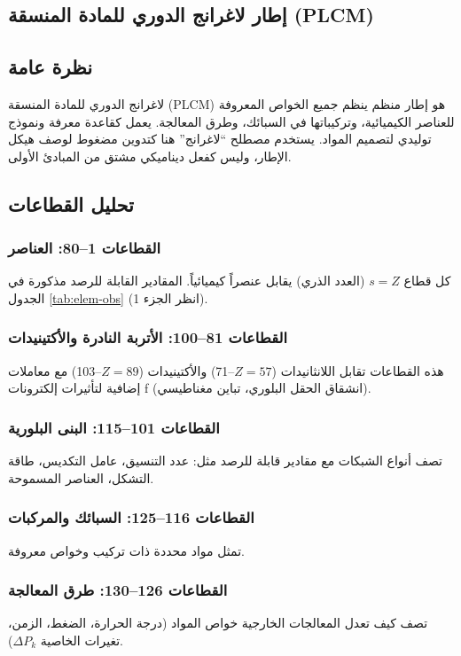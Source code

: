 \documentclass[11pt,a4paper]{article}
\begin{document}
\begin{otherlanguage}{arabic}
		\section{إطار لاغرانج الدوري للمادة المنسقة (PLCM)}
		
		\subsection{نظرة عامة}
		
		لاغرانج الدوري للمادة المنسقة (PLCM) هو إطار منظم ينظم جميع الخواص المعروفة للعناصر الكيميائية، وتركيباتها في السبائك، وطرق المعالجة. يعمل كقاعدة معرفة ونموذج توليدي لتصميم المواد. يستخدم مصطلح “لاغرانج” هنا كتدوين مضغوط لوصف هيكل الإطار، وليس كفعل ديناميكي مشتق من المبادئ الأولى.
		
		\subsection{تحليل القطاعات}
		
		\subsubsection{القطاعات 1–80: العناصر}
		كل قطاع \(s = Z\) (العدد الذري) يقابل عنصراً كيميائياً. المقادير القابلة للرصد مذكورة في الجدول \ref{tab:elem-obs} (انظر الجزء 1).
		
		\subsubsection{القطاعات 81–100: الأتربة النادرة والأكتينيدات}
		هذه القطاعات تقابل اللانثانيدات (\(Z=57\)–71) والأكتينيدات (\(Z=89\)–103) مع معاملات إضافية لتأثيرات إلكترونات f (انشقاق الحقل البلوري، تباين مغناطيسي).
		
		\subsubsection{القطاعات 101–115: البنى البلورية}
		تصف أنواع الشبكات مع مقادير قابلة للرصد مثل: عدد التنسيق، عامل التكديس، طاقة التشكل، العناصر المسموحة.
		
		\subsubsection{القطاعات 116–125: السبائك والمركبات}
		تمثل مواد محددة ذات تركيب وخواص معروفة.
		
		\subsubsection{القطاعات 126–130: طرق المعالجة}
		تصف كيف تعدل المعالجات الخارجية خواص المواد (درجة الحرارة، الضغط، الزمن، تغيرات الخاصية \(\Delta P_k\)).
		

\end{otherlanguage}
\end{document}
